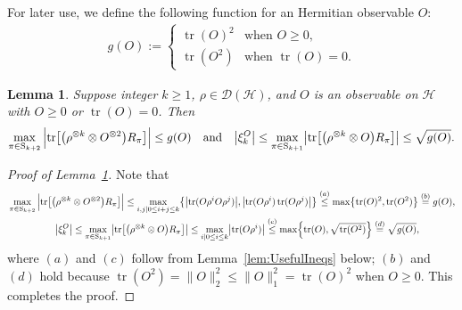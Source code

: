 \documentclass[aps,prl,twocolumn,nofootinbib,superscriptaddress,10pt]{revtex4-2}
\let\originalleft\left
\let\originalright\right
\renewcommand{\left}{\mathopen{}\mathclose\bgroup\originalleft}
\renewcommand{\right}{\aftergroup\egroup\originalright}
\DeclareMathOperator{\Tr}{tr}
\theoremstyle{plain}
\newtheorem{lemma}{Lemma}
\theoremstyle{definition}
\newcommand{\caH}{\mathcal{H}}
\newcommand{\caD}{\mathcal{D}}
\newcommand{\lref}[1]{Lemma~\ref{#1}}
\begin{document}
For later use, we define the following function for an Hermitian observable $O$:
\begin{align}\label{eq:definegO}
g(O):=
\begin{cases}
	\Tr(O)^2 &  \text{when } O \geq 0, \\
	\Tr(O^2)   &  \text{when } \Tr(O)=0.   
\end{cases}
\end{align}



\begin{lemma}\label{lem:xikOUB}
Suppose integer $k\geq 1$, $\rho\in\caD(\caH)$, 
and $O$ is an observable on $\caH$ with  $O\geq0$ or $\Tr(O)=0$. 
Then 
\begin{align}\label{eq:xikOUB}
\max_{\pi\in\mathrm{S}_{k+2}}
\Big| \!\Tr\!\big[ \left( \rho^{\otimes k} \otimes O^{\otimes 2} \right) R_{\pi} \big] \Big| 
\leq g(O)
\quad \text{and} \quad
\left| \xi_k^{O}\right| \leq
\max_{\pi\in\mathrm{S}_{k+1}} \left| \Tr\left[ \left(\rho^{\otimes k} \otimes O \right)R_\pi\right]  \right|
\leq \sqrt{g(O)}. 
\end{align}
\end{lemma}




\begin{proof}[Proof of \lref{lem:xikOUB}]
Note that 
\begin{align}
&\max_{\pi\in\mathrm{S}_{k+2}}
\Big| \!\Tr\!\big[ \left( \rho^{\otimes k} \otimes O^{\otimes 2} \right) R_{\pi} \big] \Big| 
\leq
\max_{i,j|0\leq i+j \leq k} \left\lbrace \left| \Tr(O\rho^iO\rho^j) \right|,
\left| \Tr(O\rho^i) \Tr(O\rho^j) \right| \right\rbrace 
\stackrel{(a)}{\leq} \max \left\lbrace \Tr(O)^2, \Tr(O^2) \right\rbrace 
\stackrel{(b)}{=}g(O), 
\\
&\qquad\qquad\quad
\left| \xi_k^{O}\right| \leq
\max_{\pi\in\mathrm{S}_{k+1}} \left| \Tr\left[ \left(\rho^{\otimes k} \otimes O \right)R_\pi\right]  \right| 
\leq \max_{i|0\leq i\leq k} \left| \Tr(O\rho^i) \right|
\stackrel{(c)}{\leq} \max \left\lbrace \Tr(O), \sqrt{\Tr(O^2)} \right\rbrace 
\stackrel{(d)}{=}\sqrt{g(O)}, 
\end{align}
where $(a)$ and $(c)$ follow from \lref{lem:UsefulIneqs} below; 
$(b)$ and $(d)$ hold because $\Tr(O^2)=\|O\|_2^2 \leq\|O\|_1^2= \Tr(O)^2$ when $O\geq0$. 
This completes the proof. 
\end{proof}
\end{document}
